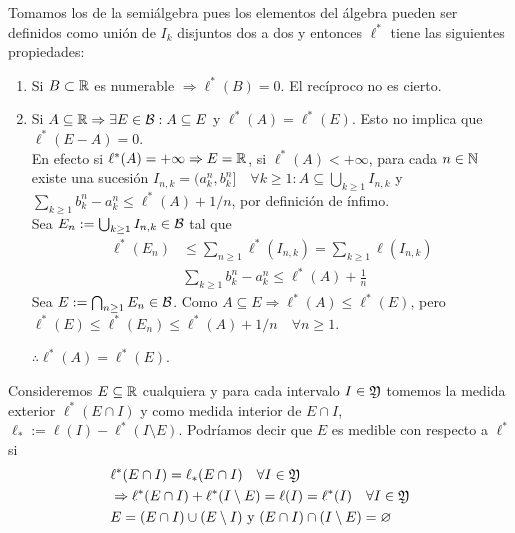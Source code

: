 Tomamos los de la semiálgebra pues los elementos del álgebra pueden ser definidos como unión de \(I_k\) disjuntos dos a dos y entonces \(\ell^*\) tiene las siguientes propiedades:
\begin{enumerate}
    \item Si \(B \subset \mathbb{R}\) es numerable \(\Rightarrow \ell^*(B) = 0\). El recíproco no es cierto.
    \item Si \(A \subseteq \mathbb{R} \Rightarrow \exists E \in \mathcal{B} : A \subseteq E\) y \(\ell^*(A) = \ell^*(E)\). Esto no implica que \(\ell^*(E-A) = 0\). \\
          En efecto si \(\ell^*(A) = +\infty \Rightarrow E = \mathbb{R}\), si \(\ell^*(A) < +\infty\), para cada \(n \in \mathbb{N}\) existe una sucesión \(I_{n, k} = (a_k^n, b_k^n] \quad \forall k \geq 1 :
              A \subseteq \bigcup_{k \geq 1} I_{n, k}\) y \(\sum_{k \geq 1} b_k^n - a_k^n \leq \ell^*(A) + 1/n\), por definición de ínfimo. \\
          Sea \(E_n := \bigcup_{k \geq 1} I_{n, k} \in \mathcal{B}\) tal que \begin{align*}
              \ell^*(E_n) & \leq \sum_{n \geq 1} \ell^*(I_{n, k}) = \sum_{k \geq 1} \ell(I_{n, k}) \\
                          & \sum_{k \geq 1} b_k^n - a_k^n \leq \ell^*(A) + \frac{1}{n}
          \end{align*}
          Sea \(E := \bigcap_{n \geq 1} E_n \in \mathcal{B}\). Como \(A \subseteq E \Rightarrow \ell^*(A) \leq \ell^*(E)\), pero \(\ell^*(E) \leq \ell^*(E_n) \leq \ell^*(A) + 1/n \quad \forall n \geq 1\).

          \(\therefore \ell^*(A) = \ell^*(E)\).
\end{enumerate}

\begin{note}
    Consideremos \(E \subseteq \mathbb{R}\) cualquiera y para cada intervalo \(I \in \mathfrak{Y}\) tomemos la medida exterior \(\ell^*(E \cap I)\) y como medida interior
    de \(E \cap I\), \(\ell_* := \ell(I) - \ell^*(I \setminus E)\). Podríamos decir que \(E\) es medible con respecto a \(\ell^*\) si \begin{align*}
         & \ell^*(E \cap I) = \ell_*(E \cap I) \quad \forall I \in \mathfrak{Y}                                        \\
         & \Rightarrow \ell^*(E \cap I) + \ell^*(I \setminus E) = \ell(I) = \ell^*(I) \quad \forall I \in \mathfrak{Y} \\
         & E = (E \cap I) \cup (E \setminus I) \text{ y } (E \cap I) \cap (I \setminus E) = \varnothing
    \end{align*}
\end{note}

